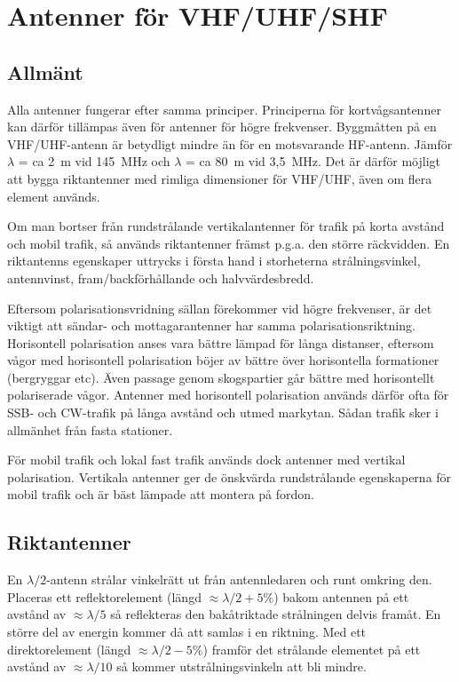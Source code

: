 \section{Antenner för VHF/UHF/SHF}

\subsection{Allmänt}

Alla antenner fungerar efter samma principer.
Principerna för kortvågsantenner kan därför tillämpas även för antenner för
högre frekvenser.
Byggmåtten på en VHF/UHF-antenn är betydligt mindre än för en motsvarande
HF-antenn.
Jämför \(\lambda\) = ca 2~m vid 145~MHz och \(\lambda\) = ca 80~m vid 3,5~MHz.
Det är därför möjligt att bygga riktantenner med rimliga dimensioner för
VHF/UHF, även om flera element används.

Om man bortser från rundstrålande vertikalantenner för trafik på korta avstånd
och mobil trafik, så används riktantenner främst p.g.a. den större räckvidden.
En riktantenns egenskaper uttrycks i första hand i storheterna strålningsvinkel,
antennvinst, fram/backförhållande och halvvärdesbredd.

Eftersom polarisationsvridning sällan förekommer vid högre frekvenser, är det
viktigt att sändar- och mottagarantenner har samma polarisationsriktning.
Horisontell polarisation anses vara bättre lämpad för långa distanser, eftersom
vågor med horisontell polarisation böjer av bättre över horisontella
formationer (bergryggar etc).
Även passage genom skogspartier går bättre med horisontellt polariserade vågor.
Antenner med horisontell polarisation används därför ofta för SSB- och
CW-trafik på långa avstånd och utmed markytan.
Sådan trafik sker i allmänhet från fasta stationer.

För mobil trafik och lokal fast trafik används dock antenner med vertikal
polarisation.
Vertikala antenner ger de önskvärda rundstrålande egenskaperna för mobil trafik
och är bäst lämpade att montera på fordon.

\subsection{Riktantenner}

En \(\lambda/2\)-antenn strålar vinkelrätt ut från antennledaren och
runt omkring den.
Placeras ett reflektorelement (längd \(\approx\lambda/2 + 5\%\)) bakom antennen
på ett avstånd av \(\approx \lambda/5\) så reflekteras den bakåtriktade
strålningen delvis framåt.
En större del av energin kommer då att samlas i en riktning.
Med ett direktorelement (längd \(\approx\lambda/2 - 5\%\)) framför det
strålande elementet på ett avstånd av \(\approx\lambda/10\) så kommer
utstrålningsvinkeln att bli mindre.

